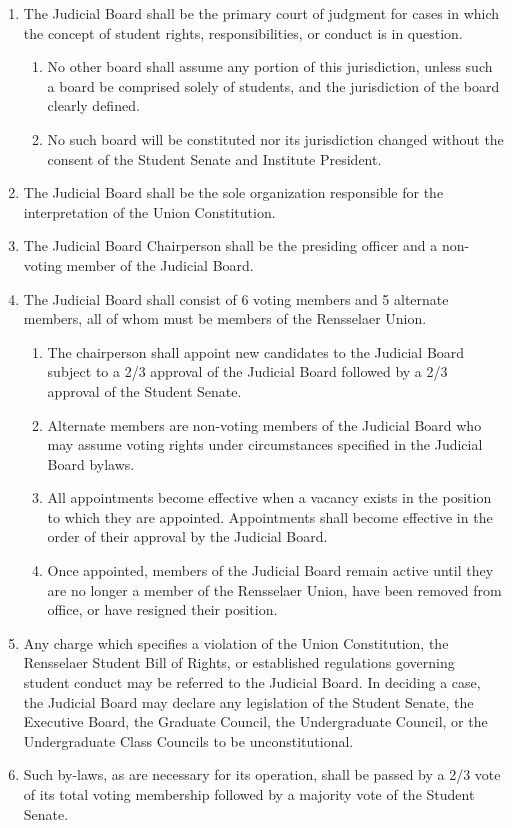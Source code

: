 
\begin{enumerate}
\item The Judicial Board shall be the primary court of judgment for cases in which the concept of student rights, responsibilities, or conduct is in question.
  \begin{enumerate}
  \item No other board shall assume any portion of this jurisdiction, unless such a board be comprised solely of students, and the jurisdiction of the board clearly defined.
  \item No such board will be constituted nor its jurisdiction changed without the consent of the Student Senate and Institute President.
  \end{enumerate}
\item The Judicial Board shall be the sole organization responsible for the interpretation of the Union Constitution.
\item The Judicial Board Chairperson shall be the presiding officer and a non-voting member of the Judicial Board.
\item The Judicial Board shall consist of 6 voting members and 5 alternate members, all of whom must be members of the Rensselaer Union.
  \begin{enumerate}
  \item The chairperson shall appoint new candidates to the Judicial Board subject to a 2/3 approval of the Judicial Board followed by a 2/3 approval of the Student Senate.
  \item Alternate members are non-voting members of the Judicial Board who may assume voting rights under circumstances specified in the Judicial Board bylaws.
  \item All appointments become effective when a vacancy exists in the position to which they are appointed. Appointments shall become effective in the order of their approval by the Judicial Board.
  \item Once appointed, members of the Judicial Board remain active until they are no longer a member of the Rensselaer Union, have been removed from office, or have resigned their position.
  \end{enumerate}
\item Any charge which specifies a violation of the Union Constitution, the Rensselaer Student Bill of Rights, or established regulations governing student conduct may be referred to the Judicial Board. In deciding a case, the Judicial Board may declare any legislation of the Student Senate, the Executive Board, the Graduate Council, the Undergraduate Council, or the Undergraduate Class Councils to be unconstitutional.
\item Such by-laws, as are necessary for its operation, shall be passed by a 2/3 vote of its total voting membership followed by a majority vote of the Student Senate.
\end{enumerate}

